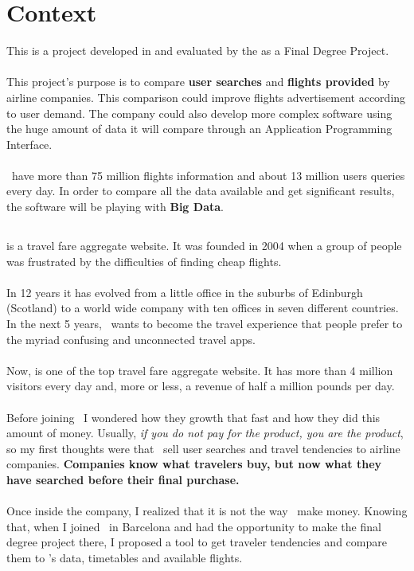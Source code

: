 
\chapter{Context}

\label{chapter01}

This is a project developed in \textit{\company} and evaluated by the \textit{\univname} as a Final Degree Project.
\\\\
This project's purpose is to compare \textbf{user searches} and \textbf{flights provided} by airline companies. This comparison could improve flights advertisement according to user demand. The company could also develop more complex software using the huge amount of data it will compare through an Application Programming Interface.
\\\\
\company\ have more than 75 million flights information and about 13 million users queries every day. In order to compare all the data available and get significant results, the software will be playing with \textbf{Big Data}.


\section{\company}

\company\cite{skyscanner_strategy} is a travel fare aggregate website. It was founded in 2004 when a group of people was frustrated by the difficulties of finding cheap flights.
\\\\
In 12 years it has evolved from a little office in the suburbs of Edinburgh (Scotland) to a world wide company with ten offices in seven different countries. In the next 5 years, \company\ wants to become the travel experience that people prefer to the myriad confusing and unconnected travel apps.
\\\\
Now, is one of the top travel fare aggregate website. It has more than 4 million visitors every day and, more or less, a revenue of half a million pounds per day.
\\\\
Before joining \company\ I wondered how they growth that fast and how they did this amount of money. Usually, \textit{if you do not pay for the product, you are the product}, so my first thoughts were that \company\ sell user searches and travel tendencies to airline companies. \textbf{Companies know what travelers buy, but now what they have searched before their final purchase.}
\\\\
Once inside the company, I realized that it is not the way \company\ make money. Knowing that, when I joined \squad\ in Barcelona and had the opportunity to make the final degree project there, I proposed a tool to get traveler tendencies and compare them to \squad's data, timetables and available flights.

